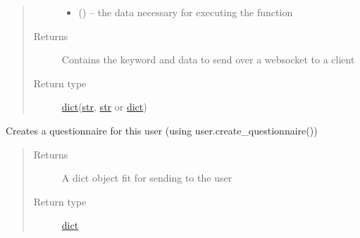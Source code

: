 \documentclass[letterpaper,10pt,english]{sphinxmanual}
\begin{document}
\begin{fulllineitems}
\begin{fulllineitems}
\begin{quote}
\begin{description}
\begin{itemize}
\item {} 
 (\href{https://docs.python.org/2/library/stdtypes.html\#dict}{}\sphinxstyleliteralemphasis{(}\href{https://docs.python.org/2/library/functions.html\#str}{}\sphinxstyleliteralemphasis{, }\href{https://docs.python.org/2/library/functions.html\#str}{}\href{https://docs.python.org/2/library/stdtypes.html\#dict}{}\sphinxstyleliteralemphasis{)}\sphinxstyleliteralemphasis{}) -- the data necessary for executing the function

\end{itemize}

\item[{Returns}] \leavevmode
Contains the keyword and data to send over a websocket to a client

\item[{Return type}] \leavevmode
\href{https://docs.python.org/2/library/stdtypes.html\#dict}{dict}(\href{https://docs.python.org/2/library/functions.html\#str}{str}, \href{https://docs.python.org/2/library/functions.html\#str}{str} or \href{https://docs.python.org/2/library/stdtypes.html\#dict}{dict})

\end{description}\end{quote}

\end{fulllineitems}


\begin{fulllineitems}
\label{\detokenize{consumer:consumer.Consumer.create_questionnaire}}
Creates a questionnaire for this user (using user.create\_questionnaire())
\begin{quote}\begin{description}
\item[{Returns}] \leavevmode
A dict object fit for sending to the user

\item[{Return type}] \leavevmode
\href{https://docs.python.org/2/library/stdtypes.html\#dict}{dict}

\end{description}\end{quote}

\end{fulllineitems}


\end{fulllineitems}
\end{document}

